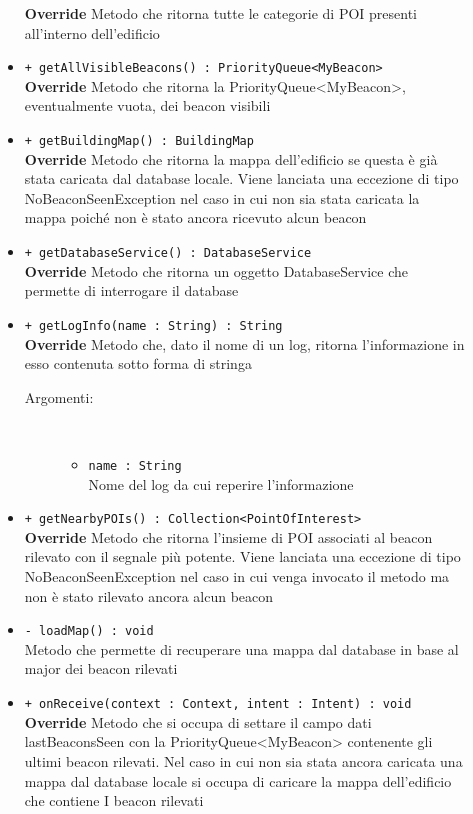 \documentclass[../DefinizioneDiProdotto.tex]{subfiles}
\begin{document}
\begin{description}
\begin{itemize}
		\textbf{Override} Metodo che ritorna tutte le categorie di POI presenti all'interno dell'edificio
		\item \texttt{+ getAllVisibleBeacons() : PriorityQueue<MyBeacon>}\\
		\textbf{Override} Metodo che ritorna la PriorityQueue<MyBeacon>, eventualmente vuota, dei beacon visibili
		\item \texttt{+ getBuildingMap() : BuildingMap}\\
		\textbf{Override} Metodo che ritorna la mappa dell'edificio se questa è già stata caricata dal database locale. Viene lanciata una eccezione di tipo NoBeaconSeenException nel caso in cui non sia stata caricata la mappa poiché non è stato ancora ricevuto alcun beacon
		\item \texttt{+ getDatabaseService() : DatabaseService}\\
		\textbf{Override} Metodo che ritorna un oggetto DatabaseService che permette di interrogare il database
		\item \texttt{+ getLogInfo(name : String) : String}\\
		\textbf{Override} Metodo che, dato il nome di un log, ritorna l'informazione in esso contenuta sotto forma di stringa
		\begin{description}
			\item[Argomenti:] \
			\begin{itemize}
				\item \texttt{name : String}\\
				Nome del log da cui reperire l'informazione\end{itemize}
		\end{description}
		\item \texttt{+ getNearbyPOIs() : Collection<PointOfInterest>}\\
		\textbf{Override} Metodo che ritorna l'insieme di POI associati al beacon rilevato con il segnale più potente. Viene lanciata una eccezione di tipo NoBeaconSeenException nel caso in cui venga invocato il metodo ma non è stato rilevato ancora alcun beacon
		\item \texttt{- loadMap() : void}\\
		Metodo che permette di recuperare una mappa dal database in base al major dei beacon rilevati
		\item \texttt{+ onReceive(context : Context, intent : Intent) : void}\\
		\textbf{Override} Metodo che si occupa di settare il campo dati lastBeaconsSeen con la PriorityQueue<MyBeacon> contenente gli ultimi beacon rilevati. Nel caso in cui non sia stata ancora caricata una mappa dal database locale si occupa di caricare la mappa dell'edificio che contiene I beacon rilevati

\end{itemize}
\end{description}
\end{document}
